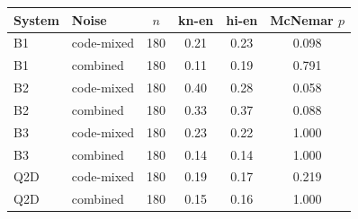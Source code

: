\begin{tabular}{llcccc}
\toprule
System & Noise & $n$ & kn-en & hi-en & McNemar $p$ \\
\midrule
B1 & code-mixed & 180 & 0.21 & 0.23 & 0.098 \\
B1 & combined & 180 & 0.11 & 0.19 & 0.791 \\
B2 & code-mixed & 180 & 0.40 & 0.28 & 0.058 \\
B2 & combined & 180 & 0.33 & 0.37 & 0.088 \\
B3 & code-mixed & 180 & 0.23 & 0.22 & 1.000 \\
B3 & combined & 180 & 0.14 & 0.14 & 1.000 \\
Q2D & code-mixed & 180 & 0.19 & 0.17 & 0.219 \\
Q2D & combined & 180 & 0.15 & 0.16 & 1.000 \\
\bottomrule
\end{tabular}

